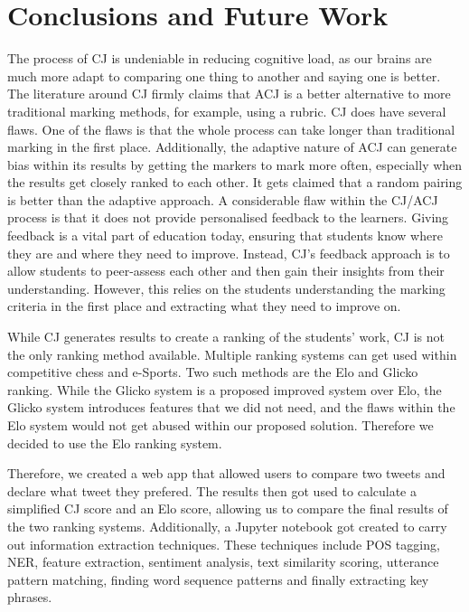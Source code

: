 \chapter{Conclusions and Future Work}
\label{chap:conclusion}


The process of CJ is undeniable in reducing cognitive load, as our brains are much more adapt to comparing one thing to another and saying one is better. The literature around CJ firmly claims that ACJ is a better alternative to more traditional marking methods, for example, using a rubric. CJ does have several flaws. One of the flaws is that the whole process can take longer than traditional marking in the first place. Additionally, the adaptive nature of ACJ can generate bias within its results by getting the markers to mark more often, especially when the results get closely ranked to each other. It gets claimed that a random pairing is better than the adaptive approach. A considerable flaw within the CJ/ACJ process is that it does not provide personalised feedback to the learners. Giving feedback is a vital part of education today, ensuring that students know where they are and where they need to improve. Instead, CJ's feedback approach is to allow students to peer-assess each other and then gain their insights from their understanding. However, this relies on the students understanding the marking criteria in the first place and extracting what they need to improve on.

While CJ generates results to create a ranking of the students' work, CJ is not the only ranking method available. Multiple ranking systems can get used within competitive chess and e-Sports. Two such methods are the Elo and Glicko ranking. While the Glicko system is a proposed improved system over Elo, the Glicko system introduces features that we did not need, and the flaws within the Elo system would not get abused within our proposed solution. Therefore we decided to use the Elo ranking system.

Therefore, we created a web app that allowed users to compare two tweets and declare what tweet they prefered. The results then got used to calculate a simplified CJ score and an Elo score, allowing us to compare the final results of the two ranking systems. Additionally, a Jupyter notebook got created to carry out information extraction techniques. These techniques include POS tagging, NER, feature extraction, sentiment analysis, text similarity scoring, utterance pattern matching, finding word sequence patterns and finally extracting key phrases.

